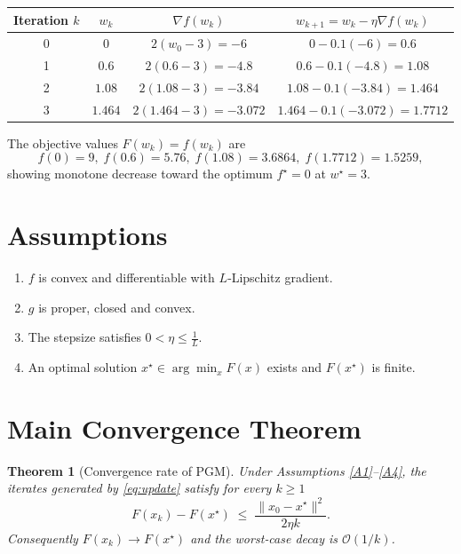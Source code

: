 \documentclass{article}
\newtheorem{theorem}{Theorem}
\begin{document}
\begin{center}
\begin{tabular}{c|c|c|c}
Iteration $k$ & $w_{k}$ & $\nabla f(w_{k})$ & $w_{k+1}=w_{k}-\eta\nabla f(w_{k})$\\\hline
0 & $0$ & $2(w_{0}-3)=-6$ & $0-0.1(-6)=0.6$\\
1 & $0.6$ & $2(0.6-3)=-4.8$ & $0.6-0.1(-4.8)=1.08$\\
2 & $1.08$ & $2(1.08-3)=-3.84$ & $1.08-0.1(-3.84)=1.464$\\
3 & $1.464$ & $2(1.464-3)=-3.072$ & $1.464-0.1(-3.072)=1.7712$
\end{tabular}
\end{center}
The objective values $F(w_{k})=f(w_{k})$ are
\[
f(0)=9,\; f(0.6)=5.76,\; f(1.08)=3.6864,\; f(1.7712)=1.5259,
\]
showing monotone decrease toward the optimum $f^{\star}=0$ at $w^{\star}=3$.

\newpage
\section*{Assumptions}
\begin{enumerate}[label=\textbf{A\arabic*.}, leftmargin=*]
\item \label{A1} $f$ is convex and differentiable with $L$‑Lipschitz gradient.
\item \label{A2} $g$ is proper, closed and convex.
\item \label{A3} The stepsize satisfies $0<\eta\le\frac{1}{L}$.
\item \label{A4} An optimal solution $x^{\star}\in\arg\min_{x}F(x)$ exists and $F(x^{\star})$ is finite.
\end{enumerate}

\section*{Main Convergence Theorem}
\begin{theorem}[Convergence rate of PGM]\label{thm:rate}
Under Assumptions \ref{A1}–\ref{A4}, the iterates generated by \eqref{eq:update} satisfy for every $k\ge1$
\begin{equation}
F(x_{k})-F(x^{\star})\;\le\;\frac{\|x_{0}-x^{\star}\|^{2}}{2\eta k}.
\label{eq:rate}
\end{equation}
Consequently $F(x_{k})\to F(x^{\star})$ and the worst‑case decay is $\mathcal{O}(1/k)$.
\end{theorem}
\end{document}
